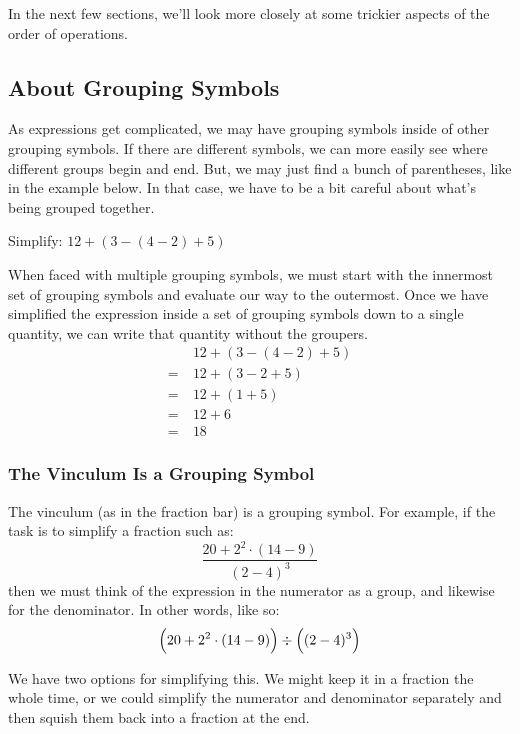 In the next few sections, we'll look more closely at some trickier aspects of the order of operations.

\subsection{About Grouping Symbols}

As expressions get complicated, we may have grouping symbols inside of other grouping symbols. If there are different symbols, we can more easily see where different groups begin and end. But, we may just find a bunch of parentheses, like in the example below. In that case, we have to be a bit careful about what's being grouped together.

\begin{boxedex}
Simplify: $12+(3-(4-2)+5)$

\exsoln{} When faced with multiple grouping symbols, we must start with the innermost set of grouping symbols and evaluate our way to the outermost. Once we have simplified the expression inside a set of grouping symbols down to a single quantity, we can write that quantity without the groupers.
\[\begin{aligned}
	&~ 12+(3-(4-2)+5)\\
=	&~ 12+(3-2+5)\\
=	&~ 12+(1+5)\\
=	&~ 12+6\\
=	&~ 18
\end{aligned}\]
\end{boxedex}

\subsubsection{The Vinculum Is a Grouping Symbol}

The \gls{vinculum} (as in the fraction bar) is a grouping symbol. For example, if the task is to simplify a fraction such as: \[\frac{20+2^2\cdot(14-9)}{(2-4)^3}\] then we must think of the expression in the numerator as a group, and likewise for the denominator. In other words, like so: \[\Bigl(20+2^2\cdot(14-9)\Bigr)\div\Bigl((2-4)^3\Bigr)\]

We have two options for simplifying this. We might keep it in a fraction the whole time, or we could simplify the numerator and denominator separately and then squish them back into a fraction at the end.

